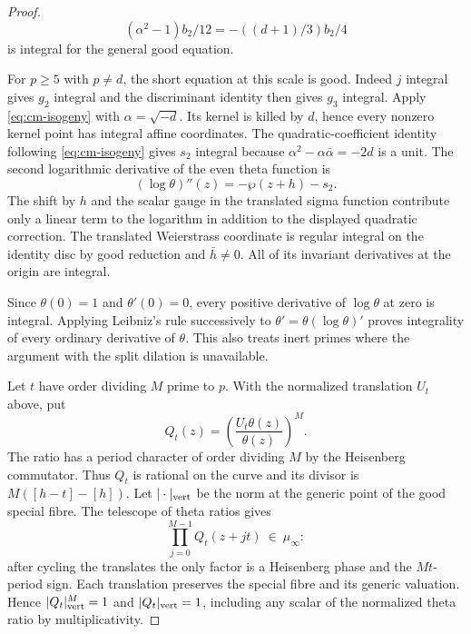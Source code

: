 \begin{proof}
\[
  (\alpha^2-1)b_2/12=-((d+1)/3)b_2/4
\]
 is integral for the
general good equation. \label{cor:baseline-jets-1}


For \(p\ge5\) with \(p\ne d\), the short equation at this
scale is good. Indeed \(j\) integral gives \(g_2\) integral
and the discriminant identity then gives \(g_3\) integral.
Apply \eqref{eq:cm-isogeny} with \(\alpha=\sqrt{-d}\).
Its kernel is killed by \(d\), hence every nonzero kernel point
has integral affine coordinates. The quadratic-coefficient
identity following \eqref{eq:cm-isogeny} gives \(s_2\) integral
because \(\alpha^2-\alpha\bar\alpha=-2d\) is a unit. The
second logarithmic derivative of the even theta function is
\[
           (\log\theta)''(z)=-\wp(z+h)-s_2 .
\]
The shift by \(h\) and the scalar gauge in the translated sigma
function contribute only a linear term to the logarithm in
addition to the displayed quadratic correction. The translated
Weierstrass coordinate is regular integral on the identity
disc by good reduction and \(\bar h\ne0\). All of its invariant
derivatives at the origin are integral.

Since \(\theta(0)=1\)
and \(\theta'(0)=0\), every positive derivative of
\(\log\theta\) at zero is integral. Applying Leibniz's rule
successively to \(\theta'=\theta(\log\theta)'\) proves
integrality of every ordinary derivative of \(\theta\).
This also treats inert primes where the argument with the
split dilation is unavailable.


Let \(t\) have order dividing \(M\) prime to \(p\). With the
normalized translation \(U_t\) above, put
\[
       Q_t(z)=\left(\frac{U_t\theta(z)}{\theta(z)}\right)^M .
\]
The ratio has a period character of order dividing \(M\) by
the Heisenberg commutator. Thus \(Q_t\) is rational on the
curve and its divisor is \(M([h-t]-[h])\).
Let \(|\cdot|_{\rm vert}\) be the norm at the
generic point of the good special fibre. The telescope
of theta ratios gives
\[
          \prod_{j=0}^{M-1} Q_t(z+jt)\ \in\ \mu_\infty:
\]
after cycling the translates the only factor is a
Heisenberg phase and the \(Mt\)-period sign. Each
translation preserves the special fibre and its generic
valuation. Hence \(|Q_t|_{\rm vert}^M=1\) and
\(|Q_t|_{\rm vert}=1\), including any scalar of the
normalized theta ratio by multiplicativity.


\end{proof}
